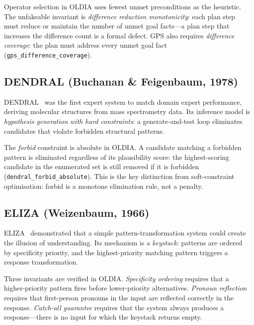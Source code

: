 Operator selection in OLDIA uses fewest unmet preconditions as the heuristic.
The unfakeable invariant is \emph{difference reduction monotonicity}: each
plan step must reduce or maintain the number of unmet goal facts---a plan step
that increases the difference count is a formal defect.  GPS also requires
\emph{difference coverage}: the plan must address every unmet goal fact
(\texttt{gps\_difference\_coverage}).

\subsection{DENDRAL (Buchanan \& Feigenbaum, 1978)}
\label{subsec:dendral}

DENDRAL~\cite{buchanan1978} was the first expert system to match domain
expert performance, deriving molecular structures from mass spectrometry data.
Its inference model is \emph{hypothesis generation with hard constraints}:
a generate-and-test loop eliminates candidates that violate forbidden
structural patterns.

The \emph{forbid} constraint is absolute in OLDIA.  A candidate matching a
forbidden pattern is eliminated regardless of its plausibility score: the
highest-scoring candidate in the enumerated set is still removed if it is
forbidden (\texttt{dendral\_forbid\_absolute}).  This is the key distinction
from soft-constraint optimisation: forbid is a monotone elimination rule, not
a penalty.

\subsection{ELIZA (Weizenbaum, 1966)}
\label{subsec:eliza}

ELIZA~\cite{weizenbaum1966} demonstrated that a simple pattern-transformation
system could create the illusion of understanding.  Its mechanism is a
\emph{keystack}: patterns are ordered by specificity priority, and the
highest-priority matching pattern triggers a response transformation.

Three invariants are verified in OLDIA.  \emph{Specificity ordering} requires
that a higher-priority pattern fires before lower-priority alternatives.
\emph{Pronoun reflection} requires that first-person pronouns in the input are
reflected correctly in the response.  \emph{Catch-all guarantee} requires that
the system always produces a response---there is no input for which the keystack
returns empty.

